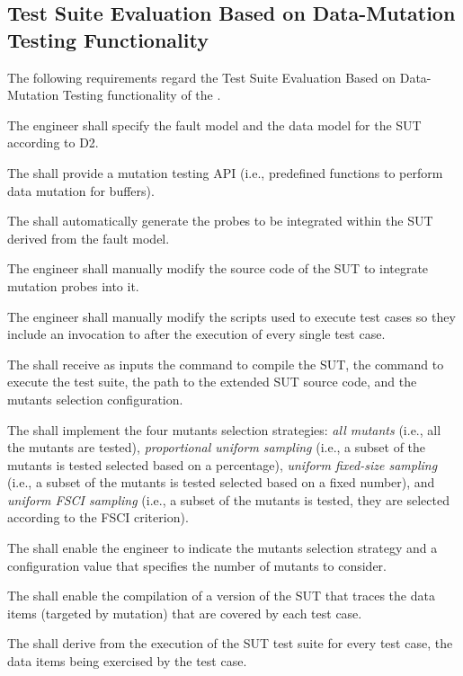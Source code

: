 
\subsection{Test Suite Evaluation Based on Data-Mutation Testing Functionality}
\label{sec:dataDriven}

The following requirements regard the Test Suite Evaluation Based on Data-Mutation Testing functionality of the \FAQAS.

\RQ{} The engineer shall specify the fault model and the data model for the SUT according to D2.

\RQ{} The \FAQAS shall provide a mutation testing API (i.e., predefined functions to perform data mutation for buffers).

\RQ{} The \FAQAS shall automatically generate the probes to be integrated within the SUT derived from the fault model.

\RQ{} The engineer shall manually modify the source code of the SUT to integrate mutation probes into it.

\RQ{} The engineer shall manually modify the scripts used to execute test cases so they include an invocation to \FAQAS after the execution of every single test case. 

\RQ{} The \FAQAS shall receive as inputs the command to compile the SUT, the command to execute the test suite, the path to the extended SUT source code, and the mutants selection configuration. 

\RQ{} The \FAQAS shall implement the four mutants selection strategies: \emph{all mutants} (i.e., all the mutants are tested), \emph{proportional uniform sampling} (i.e., a subset of the mutants is tested selected based on a percentage), \emph{uniform fixed-size sampling} (i.e., a subset of the mutants is tested selected based on a fixed number), and \emph{uniform FSCI sampling} (i.e., a subset of the mutants is tested, they are selected according to the FSCI criterion).

\RQ{} The \FAQAS shall enable the engineer to indicate the mutants selection strategy and a configuration value that specifies the number of mutants to consider.

\RQ{} The \FAQAS shall enable the compilation of a version of the SUT that traces the data items (targeted by mutation) that are covered by each test case.

\RQ{} The \FAQAS shall derive from the execution of the SUT test suite for every test case, the data items being exercised by the test case.

